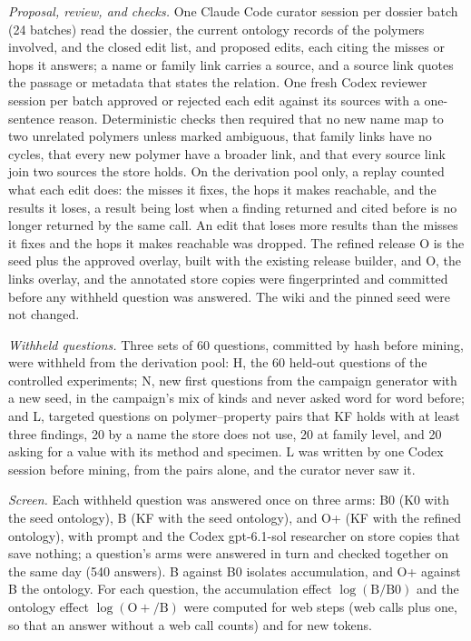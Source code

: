\documentclass[journal=mamobx,manuscript=suppinfo]{achemso}
\newcommand{\ident}[1]{\path{#1}}
\begin{document}
\emph{Proposal, review, and checks.}
One Claude Code curator session per dossier batch (24 batches) read the dossier, the current ontology records of the polymers involved, and the closed edit list, and proposed edits, each citing the misses or hops it answers; a name or family link carries a source, and a source link quotes the passage or metadata that states the relation.
One fresh Codex reviewer session per batch approved or rejected each edit against its sources with a one-sentence reason.
Deterministic checks then required that no new name map to two unrelated polymers unless marked ambiguous, that family links have no cycles, that every new polymer have a broader link, and that every source link join two sources the store holds.
On the derivation pool only, a replay counted what each edit does: the misses it fixes, the hops it makes reachable, and the results it loses, a result being lost when a finding returned and cited before is no longer returned by the same call.
An edit that loses more results than the misses it fixes and the hops it makes reachable was dropped.
The refined release O is the seed plus the approved overlay, built with the existing release builder, and O, the links overlay, and the annotated store copies were fingerprinted and committed before any withheld question was answered.
The wiki and the pinned seed were not changed.

\emph{Withheld questions.}
Three sets of 60 questions, committed by hash before mining, were withheld from the derivation pool: H, the 60 held-out questions of the controlled experiments; N, new first questions from the campaign generator with a new seed, in the campaign's mix of kinds and never asked word for word before; and L, targeted questions on polymer--property pairs that KF holds with at least three findings, 20 by a name the store does not use, 20 at family level, and 20 asking for a value with its method and specimen.
L was written by one Codex session before mining, from the pairs alone, and the curator never saw it.

\emph{Screen.}
Each withheld question was answered once on three arms: B0 (K0 with the seed ontology), B (KF with the seed ontology), and O+ (KF with the refined ontology), with prompt \ident{0b7bb1483235} and the Codex gpt-6.1-sol researcher on store copies that save nothing; a question's arms were answered in turn and checked together on the same day (540 answers).
B against B0 isolates accumulation, and O+ against B the ontology.
For each question, the accumulation effect $\log(\mathrm{B}/\mathrm{B0})$ and the ontology effect $\log(\mathrm{O{+}}/\mathrm{B})$ were computed for web steps (web calls plus one, so that an answer without a web call counts) and for new tokens.
\end{document}
